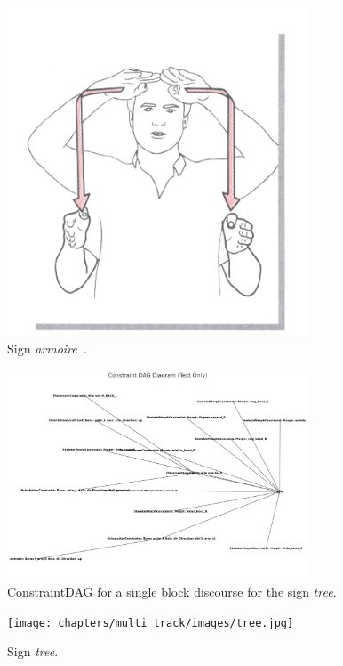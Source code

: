 \documentclass[../../main.tex]{subfiles}
\begin{document}
\begin{figure}
    \centering
    \includegraphics[width=0.8\textwidth]{chapters/multi_track/images/cupboard.jpg}
    \caption{Sign \emph{armoire}~\cite{moody97}.}
    \label{fig:armoire_sign}
\end{figure}

\begin{figure}[h]
    \centering
    \includegraphics[width=0.8\textwidth]{chapters/multi_track/images/constraint_dag.png}
    \caption{ConstraintDAG for a single block discourse for the sign \emph{tree}.}
    \label{fig:constraint_dag_tree}
\end{figure}

\begin{figure}
    \centering
    \texttt{[image: chapters/multi\_track/images/tree.jpg]}
    \caption{Sign \emph{tree}.}
    \label{fig:tree_sign}
\end{figure}
\end{document}
